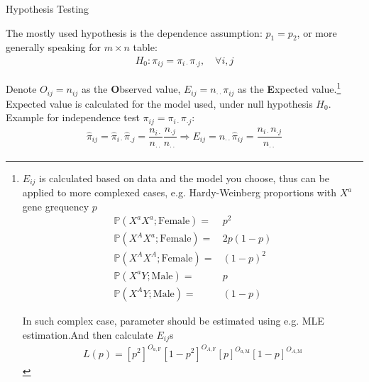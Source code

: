 \begin{point}
    Hypothesis Testing
\end{point}

    The mostly used hypothesis is the dependence assumption: $ p_1=p_2 $, or more generally speaking for $ m\times n $ table:
    \begin{align}
        H_0:\pi_{ij}=\pi_{i\cdot }\pi_{\cdot j},\quad \forall i,j 
    \end{align}

    Denote $ O_{ij}=n_{ij} $ as the \textbf{O}bserved value, $ E_{ij}=n_{\cdot \cdot }\pi_{ij} $ as the \textbf{E}xpected value.\footnote{$ E_{ij} $ is calculated based on data and the model you choose, thus can be applied to more complexed cases, e.g. Hardy-Weinberg proportions with $ X^a $ gene grequency $ p $
    \begin{align}
        \mathbb{P}\left( X^aX^a;\mathrm{Female}  \right)  =&p^2\\
        \mathbb{P}\left( X^AX^a;\mathrm{Female}  \right)  =&2p(1-p)\\
        \mathbb{P}\left( X^AX^A;\mathrm{Female}  \right)  =&(1-p)^2\\
        \mathbb{P}\left( X^aY;\mathrm{Male}  \right)=&p\\
        \mathbb{P}\left( X^AY;\mathrm{Male}  \right) =&(1-p) 
    \end{align}

    In such complex case, parameter should be estimated using e.g. MLE estimation.And then calculate $ E_{ij} $s
    \begin{align}
        L(p)=\left[p^2\right]^{O_{a,\mathrm{F} }}\left[1-p^2\right] ^{O_{A,\mathrm{F} }}\left[p\right]^{O_{a,\mathrm{M}}}\left[1-p\right]^{O_{A,\mathrm{M} }}
    \end{align}
    
    
    } Expected value is calculated for the model used, under null hypothesis $ H_0 $. Example for independence test $ \pi_{ij}=\pi_{i\cdot }\pi_{\cdot j} $:
    \begin{align}
        \hat{\pi}_{ij}=\hat{\pi}_{i\cdot }\hat{\pi}_{.j}=\dfrac{n_{i\cdot }}{n_{\cdot \cdot }}\dfrac{n_{\cdot j}}{n_{\cdot \cdot }}\Rightarrow E_{ij}=n_{\cdot \cdot }\hat{\pi}_{ij}=\dfrac{n_{i\cdot }n_{\cdot j}}{n_{\cdot \cdot }} 
    \end{align}
    
